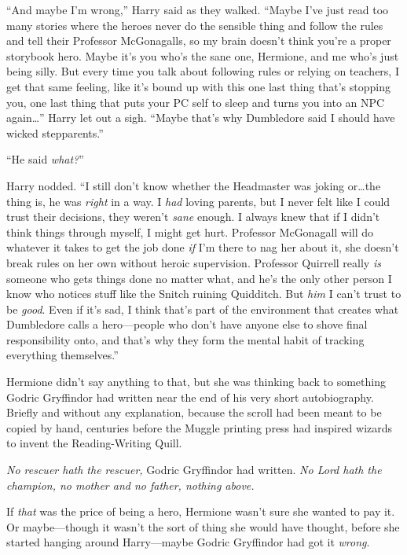 “And maybe I’m wrong,” Harry said as they walked. “Maybe I’ve just read too many stories where the heroes never do the sensible thing and follow the rules and tell their Professor McGonagalls, so my brain doesn’t think you’re a proper storybook hero. Maybe it’s you who’s the sane one, Hermione, and me who’s just being silly. But every time you talk about following rules or relying on teachers, I get that same feeling, like it’s bound up with this one last thing that’s stopping you, one last thing that puts your PC self to sleep and turns you into an NPC again…” Harry let out a sigh. “Maybe that’s why Dumbledore said I should have wicked stepparents.”

“He said \emph{what?}”

Harry nodded. “I still don’t know whether the Headmaster was joking or…the thing is, he was \emph{right} in a way. I \emph{had} loving parents, but I never felt like I could trust their decisions, they weren’t \emph{sane} enough. I always knew that if I didn’t think things through myself, I might get hurt. Professor McGonagall will do whatever it takes to get the job done \emph{if} I’m there to nag her about it, she doesn’t break rules on her own without heroic supervision. Professor Quirrell really \emph{is} someone who gets things done no matter what, and he’s the only other person I know who notices stuff like the Snitch ruining Quidditch. But \emph{him} I can’t trust to be \emph{good}. Even if it’s sad, I think that’s part of the environment that creates what Dumbledore calls a hero—people who don’t have anyone else to shove final responsibility onto, and that’s why they form the mental habit of tracking everything themselves.”

Hermione didn’t say anything to that, but she was thinking back to something Godric Gryffindor had written near the end of his very short autobiography. Briefly and without any explanation, because the scroll had been meant to be copied by hand, centuries before the Muggle printing press had inspired wizards to invent the Reading-Writing Quill.

\emph{No rescuer hath the rescuer,} Godric Gryffindor had written. \emph{No Lord hath the champion, no mother and no father, nothing above.}

If \emph{that} was the price of being a hero, Hermione wasn’t sure she wanted to pay it. Or maybe—though it wasn’t the sort of thing she would have thought, before she started hanging around Harry—maybe Godric Gryffindor had got it \emph{wrong}.

